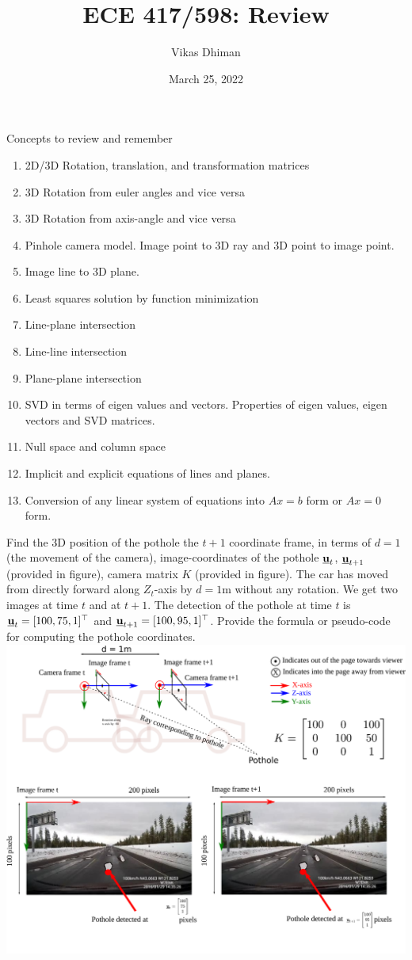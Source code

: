 \documentclass[times,t]{beamer}
\title{ECE 417/598: Review}
\author{Vikas Dhiman}
\date{March 25, 2022}
\begin{document}
\newcommand{\ubfu}{\underline{\bfu}}
\newcommand{\ubfx}{\underline{\bfx}}
\begin{frame}
  \titlepage
\end{frame}

\begin{frame}{Concepts to review and remember}
  \begin{enumerate}
    \item 2D/3D Rotation, translation, and transformation matrices
    \item 3D Rotation from euler angles and vice versa
    \item 3D Rotation from axis-angle and vice versa
    \item Pinhole camera model. Image point to 3D ray and 3D point to image point.
    \item Image line to 3D plane.
    \item Least squares solution by function minimization
    \item Line-plane intersection
    \item Line-line intersection
    \item Plane-plane intersection
    \item SVD in terms of eigen values and vectors. Properties of eigen values,
      eigen vectors and SVD matrices.
    \item Null space and column space
    \item Implicit and explicit equations of lines and planes.
    \item Conversion of any linear system of equations into $Ax = b$ form or $Ax
      = 0$ form.
  \end{enumerate}
\end{frame}

\begin{frame}{}
  Find the 3D position of the
  pothole the $t+1$ coordinate frame, in terms of $d = 1$ (the movement of the camera),
  image-coordinates of the pothole $\underline{\mathbf{u}}_t$, $\underline{\mathbf{u}}_{t+1}$ (provided in figure), camera matrix $K$ (provided in figure).
  The car has moved from directly forward along $Z_t$-axis by $d=1$m without any rotation.
  We get two images at time $t$ and at $t+1$. The detection of the pothole at
  time $t$ is $\underline{\mathbf{u}}_t = [100, 75, 1]^\top$ and
  $\underline{\mathbf{u}}_{t+1} = [100, 95, 1]^\top$.
  Provide the formula or pseudo-code for computing the
  pothole coordinates. 
  \includegraphics[width=0.7\linewidth]{media/image-road-triangulation-ray-ray.pdf}
\end{frame}

\begin{frame}
\end{frame}
\end{document}
